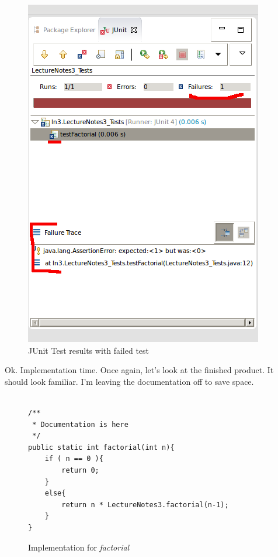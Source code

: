 \documentclass[]{tufte-handout}
\begin{document}
\vspace{.1in}
\begin{center}
\begin{figure}[!htb]
\includegraphics[scale=.5]{Eclipse-TestResult.png}
\caption{JUnit Test results with failed test}
\label{fig:tests}
\end{figure}
\end{center}
\vspace{.1in}

Ok. Implementation time. Once again, let's look at the finished product. It should look familiar. I'm leaving the documentation off to save space.

\begin{figure}
\begin{lstlisting}

/**
 * Documentation is here
 */
public static int factorial(int n){
	if ( n == 0 ){
		return 0;
	}
	else{
		return n * LectureNotes3.factorial(n-1);
	}
}

\end{lstlisting}
\label{fig:factorial}
\caption{Implementation for \textit{factorial}}
\end{figure}
\end{document}
